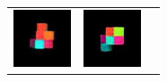 \begin{figure}[tbp]
\begin{center}
\begin{tabular}{ccc}
\begin{minipage}{0.33\linewidth}
\begin{center}
          \includegraphics[width=\linewidth]{./figures/baseline_pred_1.png}
        \end{center}
      \end{minipage} &
      \begin{minipage}{0.33\linewidth}
        \begin{center}
          \includegraphics[width=\linewidth]{./figures/baseline_pred_2.png}

\end{center}
\end{minipage}
\end{tabular}
\end{center}
\end{figure}
